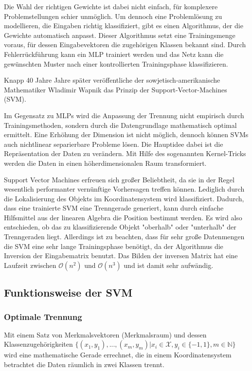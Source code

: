 Die Wahl der richtigen Gewichte ist dabei nicht einfach, für komplexere Problemstellungen schier unmöglich. 
Um dennoch eine Problemlösung zu modellieren, die Eingaben richtig klassifiziert, gibt es einen Algorithmus, der die Gewichte automatisch anpasst.
Dieser Algorithmus setzt eine Trainingsmenge voraus, für dessen Eingabevektoren die zugehörigen Klassen bekannt sind. 
Durch Fehlerrückführung kann ein MLP trainiert werden und das Netz kann die gewünschten Muster nach einer kontrollierten Trainingsphase klassifizieren.

Knapp 40 Jahre Jahre später veröffentliche der sowjetisch-amerikanische Mathematiker Wladimir Wapnik \cite{Vapnik} das Prinzip der Support-Vector-Machines (SVM).

Im Gegensatz zu MLPs wird die Anpassung der Trennung nicht empirisch durch Trainingsmethoden, sondern durch die Datengrundlage mathematisch optimal ermittelt. 
Eine Erhöhung der Dimension ist nicht möglich, dennoch können SVMs auch nichtlinear separierbare Probleme lösen. 
Die Hauptidee dabei ist die Repräsentation der Daten zu verändern. 
Mit Hilfe des sogenannten Kernel-Tricks werden die Daten in einen höherdimensionalen Raum transformiert. 

Support Vector Machines erfreuen sich großer Beliebtheit, da sie in der Regel wesentlich performanter vernünftige Vorhersagen treffen können. Lediglich durch die Lokalisierung des Objekts im Koordinatensystem wird klassifiziert. Dadurch, dass eine trainierte SVM eine Trenngerade generiert, kann durch einfache Hilfsmittel aus der linearen Algebra die Position bestimmt werden. Es wird also entschieden, ob das zu klassifizierende Objekt "{}oberhalb"{} oder "{}unterhalb"{} der Trenngeraden liegt. Allerdings ist zu beachten, dass für sehr große Datenmengen die SVM eine sehr lange Trainingsphase benötigt, da der Algorithmus die Inversion der Eingabematrix benutzt. Das Bilden der inversen Matrix hat eine Laufzeit zwischen $\mathcal O(n^2)$ und $\mathcal O(n^3)$ und ist damit sehr aufwändig.


\subsection{Funktionsweise der SVM}

\subsubsection{Optimale Trennung}
Mit einem Satz von Merkmalsvektoren (Merkmalsraum) und dessen Klassenzugehörigkeiten $\{ (x_1, y_1), ..., (x_m, y_m) | x_i \in \mathcal{X}, y_i \in \{-1, 1\}, m \in \mathbb{N} \}$ wird eine mathematische Gerade errechnet,
die in einem Koordinatensystem betrachtet die Daten räumlich in zwei Klassen trennt. 



